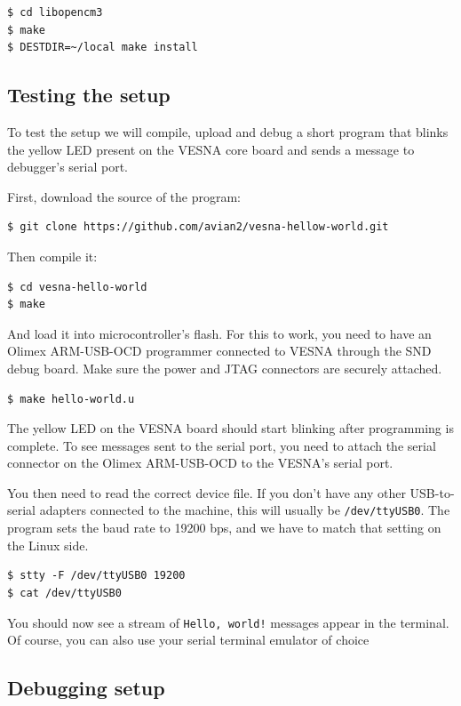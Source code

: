 \documentclass[a4paper, 10pt]{article}
\begin{document}
\begin{verbatim}
$ cd libopencm3
$ make
$ DESTDIR=~/local make install
\end{verbatim}

\subsection{Testing the setup}

To test the setup we will compile, upload and debug a short program that blinks
the yellow LED present on the VESNA core board and sends a message to debugger's
serial port.

First, download the source of the program:

\begin{verbatim}
$ git clone https://github.com/avian2/vesna-hellow-world.git
\end{verbatim}

Then compile it:

\begin{verbatim}
$ cd vesna-hello-world
$ make
\end{verbatim}

And load it into microcontroller's flash. For this to work, you need to have an
Olimex ARM-USB-OCD programmer connected to VESNA through the SND debug board.
Make sure the power and JTAG connectors are securely attached.

\begin{verbatim}
$ make hello-world.u
\end{verbatim}

The yellow LED on the VESNA board should start blinking after programming is complete.
To see messages sent to the serial port, you need to attach the serial
connector on the Olimex ARM-USB-OCD to the VESNA's serial port. 

You then need to read the correct device file. If you don't have any
other USB-to-serial adapters connected to the machine, this will usually be
\verb|/dev/ttyUSB0|. The program sets the baud rate to 19200 bps, and we have to
match that setting on the Linux side.

\begin{verbatim}
$ stty -F /dev/ttyUSB0 19200
$ cat /dev/ttyUSB0
\end{verbatim}

You should now see a stream of \verb|Hello, world!| messages appear in the
terminal. Of course, you can also use your serial terminal emulator of choice 

\subsection{Debugging setup}
\end{document}
